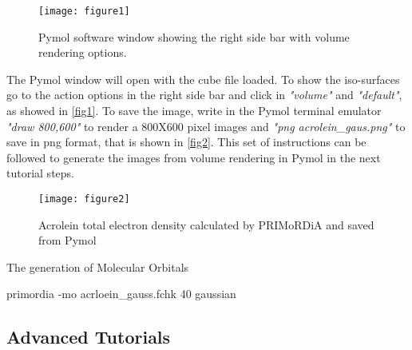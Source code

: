 \documentclass[a4paper,11pt]{refart}
\begin{document}
\begin{figure}[H]
	\texttt{[image: figure1]}
	\caption{Pymol software window showing the right side bar with volume rendering options.}
	\label{fig1}
\end{figure}

The Pymol window will open with the cube file loaded. To show the iso-surfaces go to the action options in the right side bar and click in \emph{"volume"} and \emph{"default"}, as showed in \autoref{fig1}. To save the image, write in the Pymol terminal emulator   \emph{"draw 800,600"} to render a 800X600 pixel images and \emph{"png acrolein\_gaus.png"} to save in png format, that is shown in \autoref{fig2}. This set of instructions can be followed to generate the images from volume rendering in Pymol in the next tutorial steps. 

\begin{figure}[H]
	\texttt{[image: figure2]}
	\caption{Acrolein total electron density calculated by PRIMoRDiA and saved from Pymol }
	\label{fig2}
\end{figure} 

The generation of Molecular Orbitals 

\hspace*{-\leftmarginwidth}
\begin{minipage}{\fullwidth}
	\begin{commandshell}primordia -mo acrloein_gauss.fchk  40 gaussian\end{commandshell}
\end{minipage}

\subsection{Advanced Tutorials}
\end{document}

